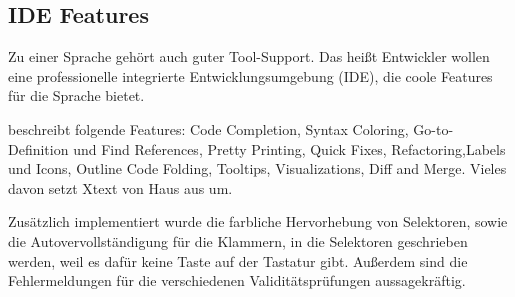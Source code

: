 \subsection{IDE Features}
    Zu einer Sprache gehört auch guter Tool-Support.
    Das heißt Entwickler wollen eine professionelle
    integrierte Entwicklungsumgebung (IDE),
    die coole Features für die Sprache bietet.

    \citet{voelter:DslEngineering} beschreibt folgende Features:
    Code Completion, Syntax Coloring, Go-to-Definition und Find References,
    Pretty Printing, Quick Fixes, Refactoring,Labels und Icons, Outline
    Code Folding, Tooltips, Visualizations, Diff and Merge.
    Vieles davon setzt Xtext von Haus aus um.

    Zusätzlich implementiert wurde die farbliche Hervorhebung von Selektoren,
    sowie die Autovervollständigung für die Klammern, in die Selektoren geschrieben werden,
    weil es dafür keine Taste auf der Tastatur gibt.
    Außerdem sind die Fehlermeldungen für die verschiedenen Validitätsprüfungen aussagekräftig.
